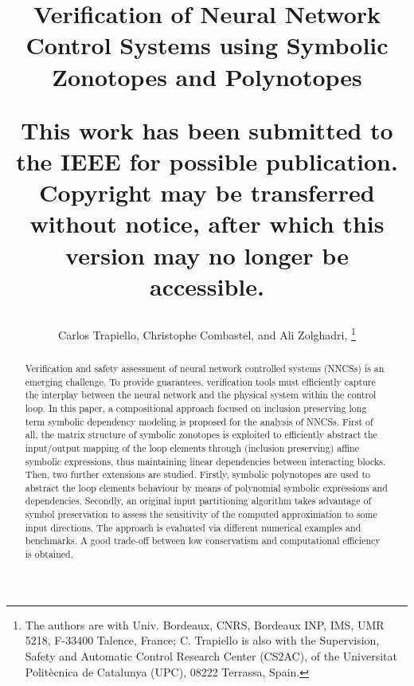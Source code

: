 \documentclass[journal]{IEEEtran}
\begin{document}

\title{Verification of Neural Network Control Systems using Symbolic Zonotopes and Polynotopes\\ \color{red}\normalsize\rule{0pt}{14pt}This work has been submitted to the IEEE for possible publication.\\Copyright may be transferred without notice, after which this version may no longer be accessible.\color{black}}

\author{Carlos Trapiello, Christophe Combastel, and Ali Zolghadri, 
\thanks{The authors are with Univ. Bordeaux, CNRS, Bordeaux INP, IMS, UMR 5218, F-33400 Talence, France; C. Trapiello is also with the Supervision, Safety and Automatic Control Research Center (CS2AC), of the Universitat Politècnica de Catalunya (UPC), 08222 Terrassa, Spain.}}


\maketitle

\begin{abstract}
Verification and safety assessment of neural network controlled systems (NNCSs) is an emerging challenge. To provide guarantees, verification tools must efficiently capture the interplay between the neural network and the physical system within the control loop. In this paper, a compositional approach focused on inclusion preserving long term symbolic dependency modeling is proposed for the analysis of NNCSs. First of all, the matrix structure of symbolic zonotopes is exploited to efficiently abstract the input/output mapping of the loop elements through (inclusion preserving) affine symbolic expressions, thus maintaining linear dependencies between interacting blocks. Then, two further extensions are studied. Firstly, symbolic polynotopes are used to abstract the loop elements behaviour by means of  polynomial symbolic expressions and dependencies. Secondly, an original input partitioning algorithm takes advantage of symbol preservation to assess the sensitivity of the computed approximation to some input directions. The approach is evaluated via different numerical examples and benchmarks. A good trade-off between low conservatism and computational efficiency is obtained.
\end{abstract}
\end{document}
